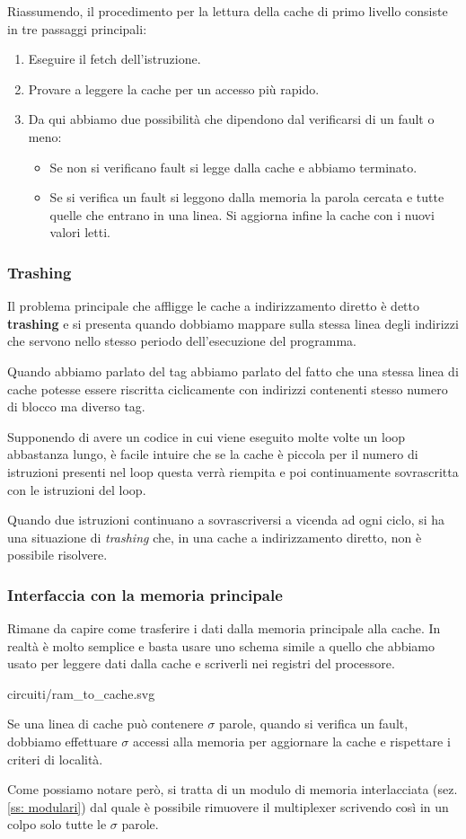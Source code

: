 Riassumendo, il procedimento per la lettura della cache di primo livello consiste in tre passaggi
principali:
\begin{enumerate}
	\item Eseguire il fetch dell'istruzione.
	\item Provare a leggere la cache per un accesso più rapido.
	\item Da qui abbiamo due possibilità che dipendono dal verificarsi di un fault o meno:
	      \begin{itemize}
		      \item Se non si verificano fault si legge dalla cache e abbiamo terminato.
		      \item Se si verifica un fault si leggono dalla memoria la parola cercata e tutte
		            quelle che entrano in una linea. Si aggiorna infine la cache con i nuovi valori
		            letti.
	      \end{itemize}
\end{enumerate}

\subsubsection{Trashing}
Il problema principale che affligge le cache a indirizzamento diretto è detto \textbf{trashing} e
si presenta quando dobbiamo mappare sulla stessa linea degli indirizzi che servono nello stesso
periodo dell'esecuzione del programma.

Quando abbiamo parlato del tag abbiamo parlato del fatto che una stessa linea di cache potesse
essere riscritta ciclicamente con indirizzi contenenti stesso numero di blocco ma diverso tag.

Supponendo di avere un codice in cui viene eseguito molte volte un loop abbastanza lungo, è facile
intuire che se la cache è piccola per il numero di istruzioni presenti nel loop questa verrà
riempita e poi continuamente sovrascritta con le istruzioni del loop.

Quando due istruzioni continuano a sovrascriversi a vicenda ad ogni ciclo, si ha una situazione di
\emph{trashing} che, in una cache a indirizzamento diretto, non è possibile risolvere.

\subsubsection{Interfaccia con la memoria principale}
Rimane da capire come trasferire i dati dalla memoria principale alla cache. In realtà è molto
semplice e basta usare uno schema simile a quello che abbiamo usato per leggere dati dalla cache e
scriverli nei registri del processore.
\begin{center}
	 {circuiti/ram_to_cache.svg}
\end{center}
Se una linea di cache può contenere $\sigma$ parole, quando si verifica un fault, dobbiamo
effettuare $\sigma$ accessi alla memoria per aggiornare la cache e rispettare i criteri di località.

Come possiamo notare però, si tratta di un modulo di memoria interlacciata (sez. \ref{ss: modulari})
dal quale è possibile rimuovere il multiplexer scrivendo così in un colpo solo tutte le $\sigma$
parole.
